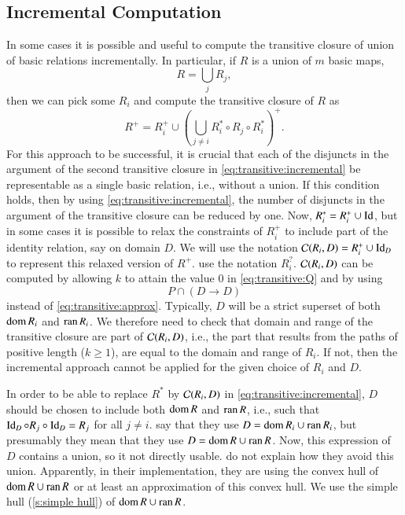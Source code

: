 \subsection{Incremental Computation}
\label{s:incremental}

In some cases it is possible and useful to compute the transitive closure
of union of basic relations incrementally.  In particular,
if $R$ is a union of $m$ basic maps,
$$
R = \bigcup_j R_j
,
$$
then we can pick some $R_i$ and compute the transitive closure of $R$ as
\begin{equation}
\label{eq:transitive:incremental}
R^+ = R_i^+ \cup
\left(
\bigcup_{j \ne i}
R_i^* \circ R_j \circ R_i^*
\right)^+
.
\end{equation}
For this approach to be successful, it is crucial that each
of the disjuncts in the argument of the second transitive
closure in \eqref{eq:transitive:incremental} be representable
as a single basic relation, i.e., without a union.
If this condition holds, then by using \eqref{eq:transitive:incremental},
the number of disjuncts in the argument of the transitive closure
can be reduced by one.
Now, $R_i^* = R_i^+ \cup \mathop{\rm Id}\nolimits$, but in some cases it is possible
to relax the constraints of $R_i^+$ to include part of the identity relation,
say on domain $D$.  We will use the notation
${\cal C}(R_i,D) = R_i^+ \cup \mathop{\rm Id}\nolimits_D$ to represent
this relaxed version of $R^+$.
\textcite{Kelly1996closure} use the notation $R_i^?$.
${\cal C}(R_i,D)$ can be computed by allowing $k$ to attain
the value $0$ in \eqref{eq:transitive:Q} and by using
$$
P \cap \left(D \to D\right)
$$
instead of \eqref{eq:transitive:approx}.
Typically, $D$ will be a strict superset of both $\mathop{\rm dom}\nolimits R_i$
and $\mathop{\rm ran}\nolimits R_i$.  We therefore need to check that domain
and range of the transitive closure are part of ${\cal C}(R_i,D)$,
i.e., the part that results from the paths of positive length ($k \ge 1$),
are equal to the domain and range of $R_i$.
If not, then the incremental approach cannot be applied for
the given choice of $R_i$ and $D$.

In order to be able to replace $R^*$ by ${\cal C}(R_i,D)$
in \eqref{eq:transitive:incremental}, $D$ should be chosen
to include both $\mathop{\rm dom}\nolimits R$ and $\mathop{\rm ran}\nolimits R$, i.e., such
that $\mathop{\rm Id}\nolimits_D \circ R_j \circ \mathop{\rm Id}\nolimits_D = R_j$ for all $j\ne i$.
\textcite{Kelly1996closure} say that they use
$D = \mathop{\rm dom}\nolimits R_i \cup \mathop{\rm ran}\nolimits R_i$, but presumably they mean that
they use $D = \mathop{\rm dom}\nolimits R \cup \mathop{\rm ran}\nolimits R$.
Now, this expression of $D$ contains a union, so it not directly usable.
\textcite{Kelly1996closure} do not explain how they avoid this union.
Apparently, in their implementation,
they are using the convex hull of $\mathop{\rm dom}\nolimits R \cup \mathop{\rm ran}\nolimits R$
or at least an approximation of this convex hull.
We use the simple hull (\autoref{s:simple hull}) of $\mathop{\rm dom}\nolimits R \cup \mathop{\rm ran}\nolimits R$.


